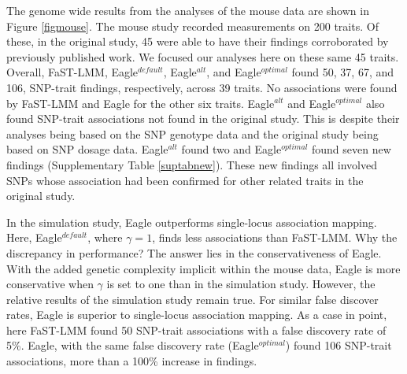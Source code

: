 \documentclass{article}
\begin{document}
  
The genome wide results from the analyses of the mouse data are shown in Figure  \ref{figmouse}. The mouse study recorded
measurements on 200 traits. Of these, in the original study, 45 were able to have their findings  corroborated by previously published work. We focused 
our analyses here on these same 45 traits. Overall,  FaST-LMM, Eagle$^{default}$, Eagle$^{alt}$, and Eagle$^{optimal}$ found 50, 37, 67, and 106, SNP-trait findings, respectively, across 39 traits. No associations were found by FaST-LMM and Eagle for the other six traits. 
Eagle$^{alt}$ and Eagle$^{optimal}$ also found SNP-trait associations not found in the original study. This is despite their analyses being based 
on the SNP genotype data and the original study being based on SNP dosage data. Eagle$^{alt}$ found two  and 
Eagle$^{optimal}$ found seven new findings (Supplementary Table \ref{suptabnew}).  These new findings all involved SNPs whose association had been confirmed for other related traits in the original 
study. 

In the simulation study, Eagle outperforms single-locus association mapping. Here, Eagle$^{default}$, where $\gamma=1$, finds less associations 
than FaST-LMM. Why the discrepancy in performance?   The answer lies in the conservativeness of Eagle.  With the added genetic complexity implicit within the mouse data, Eagle is more conservative when $\gamma$ is set to one than in the simulation study.  However, the relative results of the simulation study remain true. For similar false discover rates, Eagle is superior to single-locus association mapping. As a case in point, here FaST-LMM found 50 SNP-trait associations with a false discovery rate of 5\%. Eagle, with the same false discovery rate (Eagle$^{optimal}$) found 106 SNP-trait associations, more 
than a 100\% increase in findings. 
\end{document}
